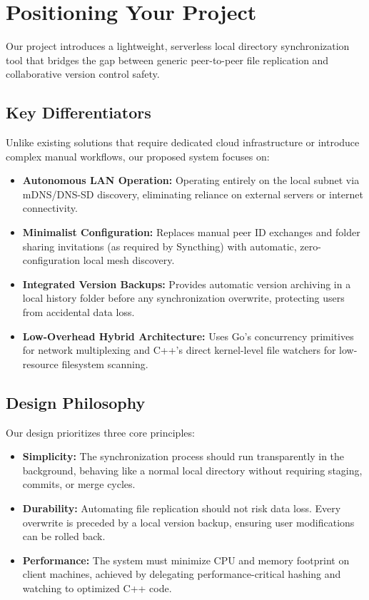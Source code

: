 \section{Positioning Your Project}

Our project introduces a lightweight, serverless local directory synchronization tool that bridges the gap between generic peer-to-peer file replication and collaborative version control safety. 

\subsection{Key Differentiators}
Unlike existing solutions that require dedicated cloud infrastructure or introduce complex manual workflows, our proposed system focuses on:
\begin{itemize}
    \item \textbf{Autonomous LAN Operation:} Operating entirely on the local subnet via mDNS/DNS-SD discovery, eliminating reliance on external servers or internet connectivity.
    \item \textbf{Minimalist Configuration:} Replaces manual peer ID exchanges and folder sharing invitations (as required by Syncthing) with automatic, zero-configuration local mesh discovery.
    \item \textbf{Integrated Version Backups:} Provides automatic version archiving in a local history folder before any synchronization overwrite, protecting users from accidental data loss.
    \item \textbf{Low-Overhead Hybrid Architecture:} Uses Go's concurrency primitives for network multiplexing and C++'s direct kernel-level file watchers for low-resource filesystem scanning.
\end{itemize}


\subsection{Design Philosophy}
Our design prioritizes three core principles:
\begin{itemize}
    \item \textbf{Simplicity:} The synchronization process should run transparently in the background, behaving like a normal local directory without requiring staging, commits, or merge cycles.
    \item \textbf{Durability:} Automating file replication should not risk data loss. Every overwrite is preceded by a local version backup, ensuring user modifications can be rolled back.
    \item \textbf{Performance:} The system must minimize CPU and memory footprint on client machines, achieved by delegating performance-critical hashing and watching to optimized C++ code.
\end{itemize}
